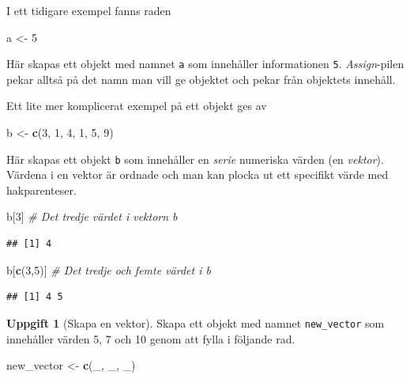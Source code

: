 \documentclass[
]{book}
\newenvironment{Shaded}{\begin{snugshade}}{\end{snugshade}}
\newcommand{\CommentTok}[1]{\textcolor[rgb]{0.56,0.35,0.01}{\textit{#1}}}
\newcommand{\DecValTok}[1]{\textcolor[rgb]{0.00,0.00,0.81}{#1}}
\newcommand{\FunctionTok}[1]{\textcolor[rgb]{0.13,0.29,0.53}{\textbf{#1}}}
\newcommand{\NormalTok}[1]{#1}
\newcommand{\OtherTok}[1]{\textcolor[rgb]{0.56,0.35,0.01}{#1}}
\theoremstyle{definition}
\theoremstyle{definition}
\theoremstyle{definition}
\newtheorem{exercise}{Uppgift}[chapter]
\theoremstyle{definition}
\theoremstyle{remark}
\begin{document}
I ett tidigare exempel fanns raden

\begin{Shaded}
\begin{Highlighting}[]
\NormalTok{a }\OtherTok{\textless{}{-}} \DecValTok{5}
\end{Highlighting}
\end{Shaded}

Här skapas ett objekt med namnet \texttt{a} som innehåller informationen \texttt{5}. \emph{Assign}-pilen pekar alltså på det namn man vill ge objektet och pekar från objektets innehåll.

Ett lite mer komplicerat exempel på ett objekt ges av

\begin{Shaded}
\begin{Highlighting}[]
\NormalTok{b }\OtherTok{\textless{}{-}} \FunctionTok{c}\NormalTok{(}\DecValTok{3}\NormalTok{, }\DecValTok{1}\NormalTok{, }\DecValTok{4}\NormalTok{, }\DecValTok{1}\NormalTok{, }\DecValTok{5}\NormalTok{, }\DecValTok{9}\NormalTok{)}
\end{Highlighting}
\end{Shaded}

Här skapas ett objekt \texttt{b} som innehåller en \emph{serie} numeriska värden (en \emph{vektor}). Värdena i en vektor är ordnade och man kan plocka ut ett specifikt värde med hakparenteser.

\begin{Shaded}
\begin{Highlighting}[]
\NormalTok{b[}\DecValTok{3}\NormalTok{]               }\CommentTok{\# Det tredje värdet i vektorn b}
\end{Highlighting}
\end{Shaded}

\begin{verbatim}
## [1] 4
\end{verbatim}

\begin{Shaded}
\begin{Highlighting}[]
\NormalTok{b[}\FunctionTok{c}\NormalTok{(}\DecValTok{3}\NormalTok{,}\DecValTok{5}\NormalTok{)]          }\CommentTok{\# Det tredje och femte värdet i b}
\end{Highlighting}
\end{Shaded}

\begin{verbatim}
## [1] 4 5
\end{verbatim}

\begin{exercise}[Skapa en vektor]

Skapa ett objekt med namnet \texttt{new\_vector} som innehåller värden 5, 7 och 10 genom att fylla i följande rad.

\begin{Shaded}
\begin{Highlighting}[]
\NormalTok{new\_vector }\OtherTok{\textless{}{-}} \FunctionTok{c}\NormalTok{(\_, \_, \_)}
\end{Highlighting}
\end{Shaded}

\end{exercise}
\end{document}
